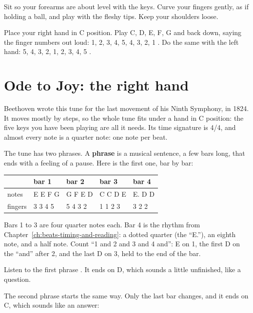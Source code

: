 Sit so your forearms are about level with the keys. Curve your fingers gently, as if holding a ball, and play with the fleshy tips. Keep your shoulders loose.

\begin{tryitbox}
Place your right hand in C position. Play C, D, E, F, G and back down, saying the finger numbers out loud: 1, 2, 3, 4, 5, 4, 3, 2, 1 . Do the same with the left hand: 5, 4, 3, 2, 1, 2, 3, 4, 5 .
\end{tryitbox}

\section{Ode to Joy: the right hand}

Beethoven wrote this tune for the last movement of his Ninth Symphony, in 1824. It moves mostly by steps, so the whole tune fits under a hand in C position: the five keys you have been playing are all it needs. Its time signature is 4/4, and almost every note is a quarter note: one note per beat.

The tune has two phrases. A \textbf{phrase} is a musical sentence, a few bars long, that ends with a feeling of a pause. Here is the first one, bar by bar:

\begin{center}
\begin{tabular}{lllll}
\toprule
 & bar 1 & bar 2 & bar 3 & bar 4 \\
\midrule
notes & E E F G & G F E D & C C D E & E. D D \\
fingers & 3 3 4 5 & 5 4 3 2 & 1 1 2 3 & 3 2 2 \\
\bottomrule
\end{tabular}
\end{center}

Bars 1 to 3 are four quarter notes each. Bar 4 is the rhythm from Chapter~\ref{ch:beats-timing-and-reading}: a dotted quarter (the ``E.''), an eighth note, and a half note. Count ``1 and 2 and 3 and 4 and'': E on 1, the first D on the ``and'' after 2, and the last D on 3, held to the end of the bar.

Listen to the first phrase . It ends on D, which sounds a little unfinished, like a question.

The second phrase starts the same way. Only the last bar changes, and it ends on C, which sounds like an answer:

